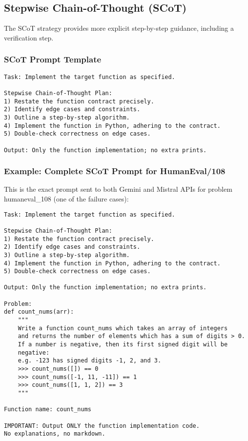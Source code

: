 \documentclass[11pt]{article}
\begin{document}
\subsection{Stepwise Chain-of-Thought (SCoT)}

The SCoT strategy provides more explicit step-by-step guidance, including a verification step.

\subsubsection{SCoT Prompt Template}

\begin{lstlisting}[caption=SCoT Generic Template (from scot\_generic.txt)]
Task: Implement the target function as specified.

Stepwise Chain-of-Thought Plan:
1) Restate the function contract precisely.
2) Identify edge cases and constraints.
3) Outline a step-by-step algorithm.
4) Implement the function in Python, adhering to the contract.
5) Double-check correctness on edge cases.

Output: Only the function implementation; no extra prints.
\end{lstlisting}

\subsubsection{Example: Complete SCoT Prompt for HumanEval/108}

This is the exact prompt sent to both Gemini and Mistral APIs for problem humaneval\_108 (one of the failure cases):

\begin{lstlisting}[caption=Complete SCoT Prompt - HumanEval/108]
Task: Implement the target function as specified.

Stepwise Chain-of-Thought Plan:
1) Restate the function contract precisely.
2) Identify edge cases and constraints.
3) Outline a step-by-step algorithm.
4) Implement the function in Python, adhering to the contract.
5) Double-check correctness on edge cases.

Output: Only the function implementation; no extra prints.

Problem:
def count_nums(arr):
    """
    Write a function count_nums which takes an array of integers 
    and returns the number of elements which has a sum of digits > 0.
    If a number is negative, then its first signed digit will be 
    negative:
    e.g. -123 has signed digits -1, 2, and 3.
    >>> count_nums([]) == 0
    >>> count_nums([-1, 11, -11]) == 1
    >>> count_nums([1, 1, 2]) == 3
    """

Function name: count_nums

IMPORTANT: Output ONLY the function implementation code. 
No explanations, no markdown.
\end{lstlisting}
\end{document}

